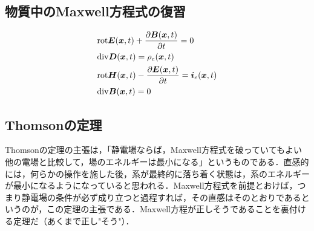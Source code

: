 \documentclass[a4paper,10pt,uplatex]{jsarticle}
\newcommand{\rot}{\mathrm{rot}}
\renewcommand{\div}{\mathrm{div}}
\newcommand{\E}{\vb*{E}}
\newcommand{\B}{\vb*{B}}
\newcommand{\D}{\vb*{D}}
\renewcommand{\H}{\vb*{H}}
\newcommand{\x}{\vb*{x}}
\renewcommand{\i}{\vb*{i}}
\begin{document}
\subsection{物質中のMaxwell方程式の復習}
\begin{align}
    &\rot \E(\x,t) + \pdv{\B(\x,t)}{t} = 0\\
    &\div \D(\x,t) = \rho_e(\x,t) \\
    &\rot \H(\x,t) - \pdv{\E(\x,t)}{t} = \i_e(\x,t) \\
    &\div \B(\x,t) = 0
\end{align}

\subsection{Thomsonの定理}
Thomsonの定理の主張は，「静電場ならば，Maxwell方程式を破っていてもよい他の電場と比較して，場のエネルギーは最小になる」というものである．直感的には，何らかの操作を施した後，系が最終的に落ち着く状態は，系のエネルギーが最小になるようになっていると思われる．Maxwell方程式を前提とおけば，つまり静電場の条件が必ず成り立つと過程すれば，その直感はそのとおりであるというのが，この定理の主張である．Maxwell方程が正しそうであることを裏付ける定理だ（あくまで正し"そう"）．
\end{document}
